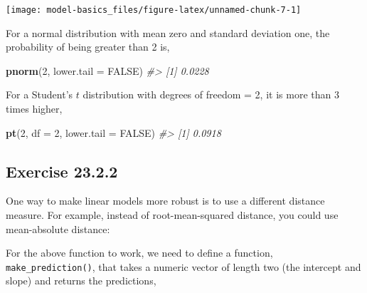 \documentclass[]{book}
\newenvironment{Shaded}{\begin{snugshade}}{\end{snugshade}}
\newcommand{\CommentTok}[1]{\textcolor[rgb]{0.56,0.35,0.01}{\textit{#1}}}
\newcommand{\ControlFlowTok}[1]{\textcolor[rgb]{0.13,0.29,0.53}{\textbf{#1}}}
\newcommand{\DataTypeTok}[1]{\textcolor[rgb]{0.13,0.29,0.53}{#1}}
\newcommand{\DecValTok}[1]{\textcolor[rgb]{0.00,0.00,0.81}{#1}}
\newcommand{\KeywordTok}[1]{\textcolor[rgb]{0.13,0.29,0.53}{\textbf{#1}}}
\newcommand{\NormalTok}[1]{#1}
\newcommand{\OperatorTok}[1]{\textcolor[rgb]{0.81,0.36,0.00}{\textbf{#1}}}
\newcommand{\OtherTok}[1]{\textcolor[rgb]{0.56,0.35,0.01}{#1}}
\newcommand{\StringTok}[1]{\textcolor[rgb]{0.31,0.60,0.02}{#1}}
\theoremstyle{plain}
\theoremstyle{remark}
\begin{document}
\begin{center}\texttt{[image: model-basics\_files/figure-latex/unnamed-chunk-7-1]} \end{center}

For a normal distribution with mean zero and standard deviation one, the
probability of being greater than 2 is,

\begin{Shaded}
\begin{Highlighting}[]
\KeywordTok{pnorm}\NormalTok{(}\DecValTok{2}\NormalTok{, }\DataTypeTok{lower.tail =} \OtherTok{FALSE}\NormalTok{)}
\CommentTok{#> [1] 0.0228}
\end{Highlighting}
\end{Shaded}

For a Student's \(t\) distribution with degrees of freedom = 2, it is
more than 3 times higher,

\begin{Shaded}
\begin{Highlighting}[]
\KeywordTok{pt}\NormalTok{(}\DecValTok{2}\NormalTok{, }\DataTypeTok{df =} \DecValTok{2}\NormalTok{, }\DataTypeTok{lower.tail =} \OtherTok{FALSE}\NormalTok{)}
\CommentTok{#> [1] 0.0918}
\end{Highlighting}
\end{Shaded}

\hypertarget{exercise-23.2.2}{%
\subsection*{\texorpdfstring{Exercise
{23.2.2}}{Exercise 23.2.2}}\label{exercise-23.2.2}}

One way to make linear models more robust is to use a different distance
measure. For example, instead of root-mean-squared distance, you could
use mean-absolute distance:

\begin{Shaded}
\end{Shaded}

For the above function to work, we need to define a function,
\texttt{make\_prediction()}, that takes a numeric vector of length two
(the intercept and slope) and returns the predictions,
\end{document}
